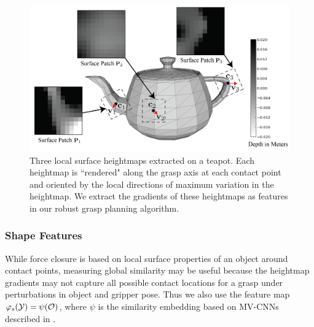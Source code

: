 \begin{figure}[t!]
\centering
\includegraphics[scale=0.35]{figures/illustrations/local_feature_model.png}
\caption{Three local surface heightmaps extracted on a teapot. Each heightmap is ``rendered" along the grasp axis at each contact point and oriented by the local directions of maximum variation in the heightmap.  We extract the gradients of these heightmaps as features in our robust grasp planning algorithm.}
\vspace*{-15pt}
\end{figure}

\subsubsection{Shape Features}
While force closure is based on local surface properties of an object around contact points, measuring global similarity may be useful because the heightmap gradients may not capture all possible contact locations for a grasp under perturbations in object and gripper pose.
Thus we also use the feature map $\varphi_{s}(\mathcal{Y}) = \psi(\mathcal{O})$, where $\psi$ is the similarity embedding based on MV-CNNs described in .

%
 
